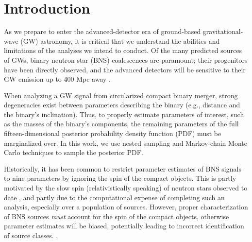 \section{Introduction}

As we prepare to enter the advanced-detector era of ground-based gravitational-wave (GW) astronomy, it is critical that we understand the abilities and limitations of the analyses we intend to conduct.  Of the many predicted sources of GWs, binary neutron star (BNS) coalescences are paramount; their progenitors have been directly observed, and the advanced detectors will be sensitive to their GW emission up to 400 Mpc away \citep{2013arXiv1304.0670L}.

When analyzing a GW signal from circularized compact binary merger, strong degeneracies exist between parameters describing the binary (e.g., distance and the binary's inclination).  Thus, to properly estimate parameters of interest, such as the masses of the binary's components, the remaining parameters of the full fifteen-dimensional posterior probability density function (PDF) must be marginalized over.  In this work, we use nested sampling \citep{Veitch_2010} and Markov-chain Monte Carlo \citep{Christensen_2003,R_ver_2006,van_der_Sluys_2008} techniques to sample the posterior PDF.

Historically, it has been common to restrict parameter estimates of BNS signals to nine parameters by ignoring the spin of the compact objects.  This is partly motivated by the slow spin (relativistically speaking) of neutron stars observed to date \citep[e.g.,][]{Mandel_2010}, and partly due to the computational expense of completing such an analysis, especially over a population of sources.  However, proper characterization of BNS sources \emph{must} account for the spin of the compact objects, otherwise parameter estimates will be biased, potentially leading to incorrect identification of source classes. \citep{Buonanno_2009,Berry_2014}.

